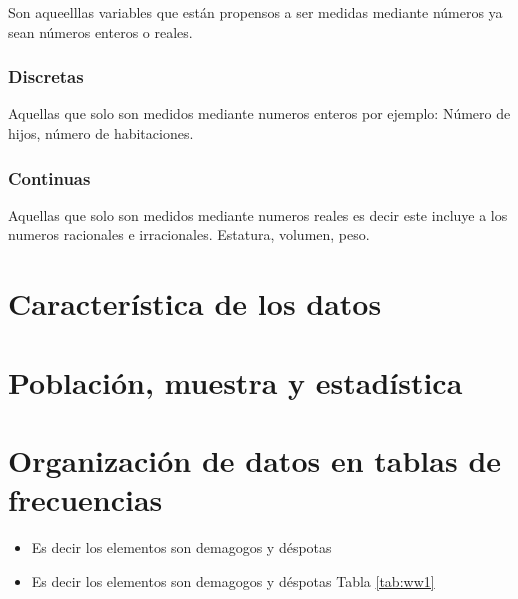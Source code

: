 \documentclass[10pt,]{krantz}
\providecommand{\tightlist}{%
  \setlength{\itemsep}{0pt}\setlength{\parskip}{0pt}}
\theoremstyle{definition}
\theoremstyle{definition}
\theoremstyle{definition}
\theoremstyle{remark}
\begin{document}
Son aqueelllas variables que están propensos a ser medidas mediante números ya sean números enteros o reales.

\hypertarget{discretas}{%
\subsection{Discretas}\label{discretas}}

Aquellas que solo son medidos mediante numeros enteros por ejemplo: Número de hijos, número de habitaciones.

\hypertarget{continuas}{%
\subsection{Continuas}\label{continuas}}

Aquellas que solo son medidos mediante numeros reales es decir este incluye a los numeros racionales e irracionales. Estatura, volumen, peso.

\hypertarget{caracteruxedstica-de-los-datos}{%
\chapter{Característica de los datos}\label{caracteruxedstica-de-los-datos}}

\hypertarget{poblaciuxf3n-muestra-y-estaduxedstica}{%
\chapter{Población, muestra y estadística}\label{poblaciuxf3n-muestra-y-estaduxedstica}}

\hypertarget{organizaciuxf3n-de-datos-en-tablas-de-frecuencias}{%
\chapter{Organización de datos en tablas de frecuencias}\label{organizaciuxf3n-de-datos-en-tablas-de-frecuencias}}

\begin{itemize}
\tightlist
\item
  Es decir los elementos son demagogos y déspotas
\item
  Es decir los elementos son demagogos y déspotas
  Tabla \ref{tab:ww1}
\end{itemize}
\end{document}
